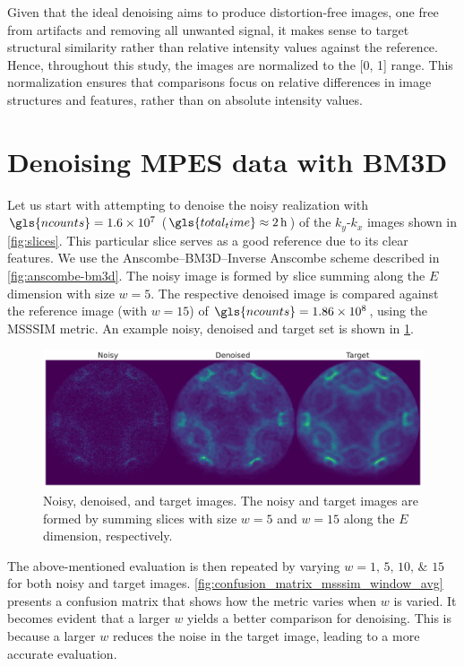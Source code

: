 Given that the ideal denoising aims to produce distortion-free images, one free from artifacts and removing all unwanted signal, it makes sense to target structural similarity rather than relative intensity values against the reference. Hence, throughout this study, the images are normalized to the [\num{0}, \num{1}] range. This normalization ensures that comparisons focus on relative differences in image structures and features, rather than on absolute intensity values.

\section{Denoising MPES data with BM3D}
Let us start with attempting to denoise the noisy realization with $\gls{ncounts}=\num{1.6e7}$ ($\gls{total_time}\approx\qty{2}{h}$) of the $k_y$-$k_x$ images shown in \cref{fig:slices}. This particular slice serves as a good reference due to its clear features. We use the Anscombe--\gls{BM3D}--Inverse Anscombe scheme described in \cref{fig:anscombe-bm3d}. The noisy image is formed by slice summing along the $E$ dimension with size $w = 5$. The respective denoised image is compared against the reference image (with $w=15$) of $\gls{ncounts}=\num{1.86e8}$, using the \gls{MSSSIM} metric. An example noisy, denoised and target set is shown in \cref{fig:noisy-denoised-ref-16M-avg-bm3d}. 

\begin{figure}
    \centering
    \includegraphics[width=1\linewidth]{images/noisy_denoised_ref_16M_avg_bm3d.pdf}
    \caption{Noisy, denoised, and target images. The noisy and target images are formed by summing slices with size $w=5$ and $w=15$ along the $E$ dimension, respectively.}
    \label{fig:noisy-denoised-ref-16M-avg-bm3d}
\end{figure}

The above-mentioned evaluation is then repeated by varying $w = \numlist{1;5;10;15}$ for both noisy and target images. \cref{fig:confusion_matrix_msssim_window_avg} presents a confusion matrix that shows how the metric varies when $w$ is varied. It becomes evident that a larger $w$ yields a better comparison for denoising. This is because a larger $w$ reduces the noise in the target image, leading to a more accurate evaluation.

